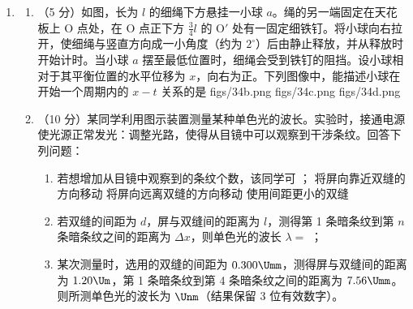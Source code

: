 \documentclass[\gkver]{gaokaozhenti}
\begin{document}
\begin{enumerate}
\item
\begin{enumerate}
	\item
	（5 分）如图，长为 $l$ 的细绳下方悬挂一小球 $a$。绳的另一端固定在天花板上 O 点处，在 O 点正下方 $\frac{3}{4}l$ 的 O$'$ 处有一固定细铁钉。将小球向右拉开，使细绳与竖直方向成一小角度（约为 $2^{\circ}$）后由静止释放，并从释放时开始计时。当小球 $a$ 摆至最低位置时，细绳会受到铁钉的阻挡。设小球相对于其平衡位置的水平位移为 $x$，向右为正。下列图像中，能描述小球在开始一个周期内的 $x-t$ 关系的是
	{figs/34b.png}
	{figs/34c.png}
	{figs/34d.png}
	\item
	（10 分）某同学利用图示装置测量某种单色光的波长。实验时，接通电源使光源正常发光：调整光路，使得从目镜中可以观察到干涉条纹。回答下列问题：
	\begin{enumerate}
		\item
		若想增加从目镜中观察到的条纹个数，该同学可 ；
		{将屏向靠近双缝的方向移动}
		{将屏向远离双缝的方向移动}
		{使用间距更小的双缝}
		\item
		若双缝的间距为 $d$，屏与双缝间的距离为 $l$，测得第 1 条暗条纹到第 $n$ 条暗条纹之间的距离为 $\Delta x$，则单色光的波长 $\lambda=$ ；
		\item
		某次测量时，选用的双缝的间距为 $0.300\Umm$，测得屏与双缝间的距离为 $1.20\Um$，第 1 条暗条纹到第 4 条暗条纹之间的距离为 $7.56\Umm$。则所测单色光的波长为  $\Unm$（结果保留 3 位有效数字）。
	\end{enumerate}
\end{enumerate}
\end{enumerate}
\end{document}

